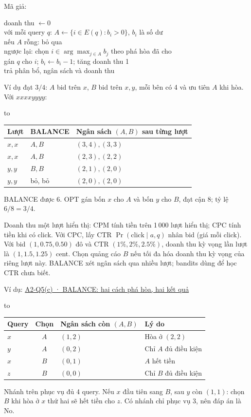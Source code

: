 \documentclass[10pt,a4paper,twocolumn]{article}
\makeatletter
\newcommand{\key}[1]{#1:\enspace}
\newcommand{\blocklabel}[1]{\par\noindent#1\par\nobreak}
\newcommand{\qlink}[2]{\hyperref[question:#1]{#2}}
\newenvironment{example}[2]{%
  \par\addvspace{6pt}\noindent
  \raggedright
  \blocklabel{Ví dụ: \qlink{#1}{#2}}%
}{\par\addvspace{4pt}}
\newenvironment{examtable}[1]{%
  \par\addvspace{2pt}\noindent\hbox to \linewidth\bgroup\hfil
  \setlength{\tabcolsep}{4pt}%
  \renewcommand{\arraystretch}{1.12}\begin{tabular}{#1}%
}{\end{tabular}\hfil\egroup\par\addvspace{2pt}}
\newenvironment{algpseudo}{%
  \par\addvspace{2pt}\noindent
  \setlength{\parskip}{0pt}%
  Mã giả:\par\nobreak
  \begin{list}{}{\setlength{\leftmargin}{1em}\setlength{\topsep}{0pt}%
    \setlength{\partopsep}{0pt}\setlength{\parsep}{0pt}%
    \@beginparpenalty=10000\relax}%
  \item\relax
}{\end{list}\par\addvspace{3pt}}
\makeatother
\begin{document}
\begin{algpseudo}
doanh thu $\gets0$\\
với mỗi query $q$: $A\gets\{i\in E(q):b_i>0\}$, $b_i$ là số dư\\
\quad nếu $A$ rỗng: bỏ qua\\
\quad ngược lại: chọn $i\in\arg\max_{j\in A}b_j$ theo phá hòa đã cho\\
\qquad gán $q$ cho $i$; $b_i\gets b_i-1$; tăng doanh thu 1\\
trả phân bổ, ngân sách và doanh thu
\end{algpseudo}

\key{Ví dụ đạt $3/4$} $A$ bid trên $x$, $B$ bid trên $x,y$, mỗi bên có 4 và ưu tiên $A$ khi hòa. Với $xxxxyyyy$:
\begin{examtable}{@{}l l l@{}}
\toprule
Lượt & BALANCE & Ngân sách $(A,B)$ sau từng lượt \\
\midrule
$x,x$ & $A,B$ & $(3,4),(3,3)$ \\
$x,x$ & $A,B$ & $(2,3),(2,2)$ \\
$y,y$ & $B,B$ & $(2,1),(2,0)$ \\
$y,y$ & bỏ, bỏ & $(2,0),(2,0)$ \\
\bottomrule
\end{examtable}
BALANCE được 6. OPT gán bốn $x$ cho $A$ và bốn $y$ cho $B$, đạt cận 8; tỷ lệ $6/8=3/4$.

\key{Doanh thu một lượt hiển thị} CPM tính tiền trên 1\,000 lượt hiển thị; CPC tính tiền khi có click. Với CPC, lấy CTR $\Pr(\mathrm{click}\mid a,q)$ nhân bid (giá mỗi click). Với bid $(1,0.75,0.50)$ đô và CTR $(1\%,2\%,2.5\%)$, doanh thu kỳ vọng lần lượt là $(1,1.5,1.25)$ cent. Chọn quảng cáo $B$ nếu tối đa hóa doanh thu kỳ vọng của riêng lượt này. BALANCE xét ngân sách qua nhiều lượt; bandits dùng để học CTR chưa biết.

\begin{example}{A2-Q5}{A2-Q5(c) · BALANCE: hai cách phá hòa, hai kết quả}
\begin{examtable}{@{}l c l l@{}}
\toprule
Query & Chọn & Ngân sách còn $(A,B)$ & Lý do \\
\midrule
$x$ & $A$ & $(1,2)$ & Hòa ở $(2,2)$ \\
$y$ & $A$ & $(0,2)$ & Chỉ $A$ đủ điều kiện \\
$x$ & $B$ & $(0,1)$ & $A$ hết tiền \\
$z$ & $B$ & $(0,0)$ & Chỉ $B$ đủ điều kiện \\
\bottomrule
\end{examtable}
Nhánh trên phục vụ đủ 4 query. Nếu $x$ đầu tiên sang $B$, sau $y$ còn $(1,1)$: chọn $B$ khi hòa ở $x$ thứ hai sẽ hết tiền cho $z$. Có nhánh chỉ phục vụ 3, nên đáp án là No.
\end{example}
\end{document}
